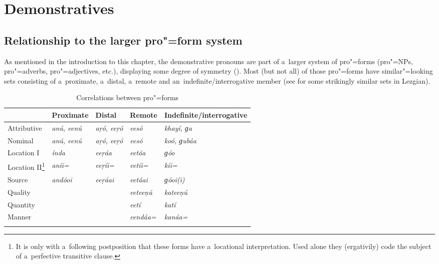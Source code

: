 \section{Demonstratives}
\label{sec:5-3}

\subsection{Relationship to the larger pro"=form system}
\label{subsec:5-2-1}


As mentioned in the introduction to this chapter, the demonstrative pronouns are part of a~larger system of pro"=forms (pro"=NPs, pro"=adverbs, pro"=adjectives, etc.), displaying some degree of symmetry (). Most (but not all) of those pro"=forms have similar"=looking sets consisting of a~proximate, a~distal, a~remote and an~indefinite/interrogative member (see \citealt[187--188]{haspelmath1993} for some strikingly similar sets in Lezgian).



\begin{table}[ht]
\caption{Correlations between pro"=forms}
\begin{tabularx}{\textwidth}{ Q Q Q Q Q }
\lsptoprule
&
Proximate
&
Distal
&
Remote
&
Indefinite/{\allowbreak}interrogative\\\hline
Attributive &
\textit{anú, eenú} &
\textit{aṛó, eeṛó} &
\textit{eesó} &
\textit{khayí, ɡa} \\
Nominal &
\textit{anú, eenú} &
\textit{aṛó, eeṛó} &
\textit{eesó} &
\textit{koó, ɡubáa} \\
Location I &
\textit{índa} &
\textit{eeṛáa} &
\textit{eetáa} &
\textit{ɡóo} \\
Location II\footnote{It is only with a~following postposition that these forms have a~locational interpretation. Used alone they (ergativily) code the subject of a~perfective transitive clause.} &
\textit{aníi=} &
\textit{eeṛíi=} &
\textit{eetíi=} &
\textit{kíi=} \\
Source &
\textit{andóoi} &
\textit{eeṛáai} &
\textit{eetáai} &
\textit{ɡóoi(i)} \\
Quality &
&
&
\textit{eeteeṇú} &
\textit{kateeṇú} \\
Quantity &
&
&
\textit{eetí} &
\textit{katí} \\
Manner &
&
&
\textit{eendáa=} &
\textit{kanáa=} \\\lspbottomrule
\end{tabularx}
\label{tab:5-2}
\end{table}


